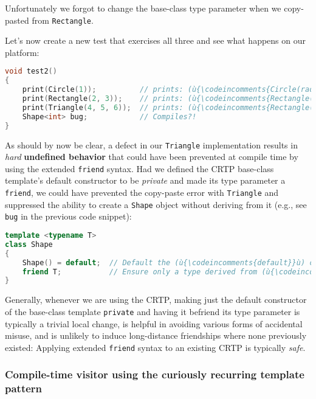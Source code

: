 \noindent Unfortunately we forgot to change the base-class type parameter when we
copy-pasted from \texttt{Rectangle}.

Let's now create a new test that exercises all three and see what
happens on our platform:

\begin{lstlisting}[language=C++]
void test2()
{
    print(Circle(1));          // prints: (ù{\codeincomments{Circle(radius = 1)}}ù)
    print(Rectangle(2, 3));    // prints: (ù{\codeincomments{Rectangle(length = 2, width = 3)}}ù)
    print(Triangle(4, 5, 6));  // prints: (ù{\codeincomments{Rectangle(length = 4, width = 5)}}ù) ?!
    Shape<int> bug;            // Compiles?!
}
\end{lstlisting}
    
\noindent As should by now be clear, a defect in our \texttt{Triangle}
implementation results in \emph{hard} \textbf{undefined behavior} that
could have been prevented at compile time by using the extended
\texttt{friend} syntax. Had we defined the CRTP base-class template's
default constructor to be \emph{private} and made its type parameter a
\texttt{friend}, we could have prevented the copy-paste error with
\texttt{Triangle} and suppressed the ability to create a \texttt{Shape}
object without deriving from it (e.g., see \texttt{bug} in the previous
code snippet):

\begin{lstlisting}[language=C++]
template <typename T>
class Shape
{
    Shape() = default;  // Default the (ù{\codeincomments{default}}ù) constructor to be (ù{\codeincomments{private}}ù).
    friend T;           // Ensure only a type derived from (ù{\codeincomments{T}}ù) has access.
}
\end{lstlisting}
    
\noindent Generally, whenever we are using the CRTP, making just the
default constructor of the base-class template \texttt{private} and
having it befriend its type parameter is typically a trivial local
change, is helpful in avoiding various forms of accidental misuse, and
is unlikely to induce long-distance friendships where none previously
existed: Applying extended \texttt{friend} syntax to an existing CRTP
is typically \emph{safe}.

\subsubsection[Compile-time visitor using the curiously recurring template pattern]{Compile-time visitor using the curiously recurring template pattern}\label{compile-time-visitor-using-crtp}

